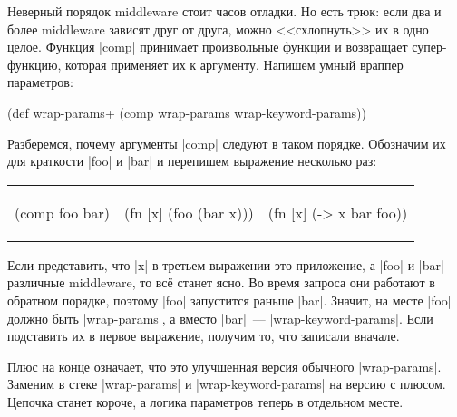 Неверный порядок middleware стоит часов отладки. Но есть трюк: если два и более
middleware зависят друг от друга, можно <<схлопнуть>> их в одно целое. Функция
\spverb|comp| принимает произвольные функции и возвращает супер-функцию, которая
применяет их к аргументу. Напишем умный враппер параметров:

\begin{english}
  \begin{clojure}
(def wrap-params+ (comp wrap-params wrap-keyword-params))
  \end{clojure}
\end{english}

Разберемся, почему аргументы \spverb|comp| следуют в таком порядке. Обозначим их
для краткости \spverb|foo| и \spverb|bar| и перепишем выражение несколько раз:

\noindent
\begin{tabular}{ @{}p{3cm} @{}p{3.5cm} @{}p{3.5cm} }

\begin{english}
  \begin{clojure}
(comp foo bar)
  \end{clojure}
\end{english}

&

\begin{english}
  \begin{clojure}
(fn [x]
  (foo (bar x)))
  \end{clojure}
\end{english}

&

\begin{english}
  \begin{clojure}
(fn [x] (-> x
            bar
            foo))
  \end{clojure}
\end{english}

\end{tabular}

Если представить, что \spverb|x| в третьем выражении это приложение, а
\spverb|foo| и \spverb|bar| различные middleware, то вс\"{е} станет ясно. Во время
запроса они работают в обратном порядке, поэтому \spverb|foo| запустится раньше
\spverb|bar|. Значит, на месте \spverb|foo| должно быть \spverb|wrap-params|, а
вместо \spverb|bar|~--- \spverb|wrap-keyword-params|. Если подставить их в
первое выражение, получим то, что записали вначале.

Плюс на конце означает, что это улучшенная версия обычного
\spverb|wrap-params|. Заменим в стеке \spverb|wrap-params| и
\spverb|wrap-keyword-params| на версию с плюсом. Цепочка станет короче, а логика
параметров теперь в отдельном месте.

